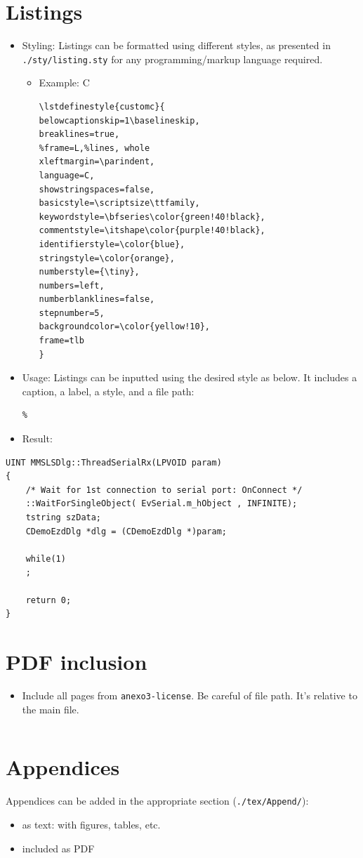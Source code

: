 \documentclass[11pt]{article}
\begin{document}
\section{Listings}
\label{sec:orga636528}
\begin{itemize}
\item Styling: Listings can be formatted using different styles, as presented in
\texttt{./sty/listing.sty} for any programming/markup language required.
\begin{itemize}
\item Example: C
\lstset{language=[LaTeX]TeX,label= ,caption= ,captionpos=b,numbers=none}
\begin{lstlisting}
\lstdefinestyle{customc}{
belowcaptionskip=1\baselineskip,
breaklines=true,
%frame=L,%lines, whole
xleftmargin=\parindent,
language=C,
showstringspaces=false,
basicstyle=\scriptsize\ttfamily,
keywordstyle=\bfseries\color{green!40!black},
commentstyle=\itshape\color{purple!40!black},
identifierstyle=\color{blue},
stringstyle=\color{orange},
numberstyle={\tiny},
numbers=left,
numberblanklines=false,
stepnumber=5,
backgroundcolor=\color{yellow!10}, 
frame=tlb
}
\end{lstlisting}
\end{itemize}
\item Usage: Listings can be inputted using the desired style as below. It includes
a caption, a label, a style, and a file path:
\lstset{language=[LaTeX]TeX,label= ,caption= ,captionpos=b,numbers=none}
\begin{lstlisting}
%
\end{lstlisting}
\item Result:
\end{itemize}
\lstset{language=C,label= ,caption= ,captionpos=b,numbers=none,style=customc}
\begin{lstlisting}
UINT MMSLSDlg::ThreadSerialRx(LPVOID param)
{
    /* Wait for 1st connection to serial port: OnConnect */
    ::WaitForSingleObject( EvSerial.m_hObject , INFINITE); 
    tstring szData;
    CDemoEzdDlg *dlg = (CDemoEzdDlg *)param;

    while(1)
    ;

    return 0;
}
\end{lstlisting}
\section{PDF inclusion}
\label{sec:org738167b}
\begin{itemize}
\item Include all pages from \texttt{anexo3-license}. Be careful of file path. It's
relative to the main file.
\lstset{language=[LaTeX]TeX,label= ,caption= ,captionpos=b,numbers=none}
\begin{lstlisting}

\end{lstlisting}
\end{itemize}
\section{Appendices}
\label{sec:org04315bb}
Appendices can be added in the appropriate section (\texttt{./tex/Append/}):
\begin{itemize}
\item as text: with figures, tables, etc.
\item included as PDF
\end{itemize}
\end{document}
